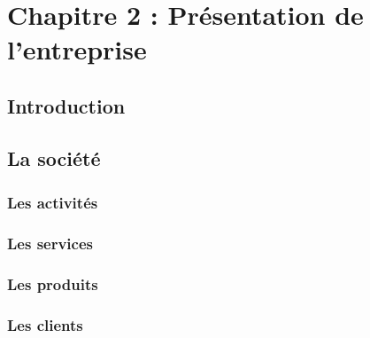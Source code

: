 
\chapter{Chapitre 2 : Présentation de l'entreprise}
\section*{Introduction}
{}
\paragraph{}
\lipsum[1]

\section{La société} 
\paragraph{}
        \subsection{Les activités}
        \paragraph{}
        \subsection{Les services}
        \paragraph{}
        \subsection{Les produits}
        \paragraph{}
        \subsection{Les clients}
        \paragraph{}

